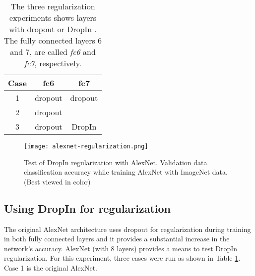 \documentclass[10pt,twocolumn,letterpaper]{article}
\newcommand{\dropin}{DropIn }
\begin{document}

\begin{table}[h]
  \vspace{-5pt}
\begin{center}
  \begin{tabular}{| c | c | c |}
    \hline
    Case & fc6 & fc7 \\ \hline \hline
   1 & dropout  & dropout \\ \hline
   2 & dropout  &  \\ \hline
   3 & dropout  & \dropin \\ \hline
  \end{tabular}
  \caption{The three regularization experiments shows layers with dropout or \dropin. The fully connected layers 6 and 7, are called \textit{fc6} and \textit{fc7}, respectively. }
  \label{tab:reg}
\end{center}
  \vspace{-15pt}
\end{table}


\begin{figure}[h]
\begin{center}
   \texttt{[image: alexnet-regularization.png]}
\end{center}
  \vspace{-10pt}
   \caption{Test of \dropin regularization with AlexNet. Validation data classification accuracy while training AlexNet with ImageNet data.  %
(Best viewed in color) 
}
\label{fig:regularization}
  \vspace{-15pt}
\end{figure}




\subsection{Using \dropin for regularization}
\label{sec:regularization}
The original AlexNet architecture uses dropout for regularization during training in both fully connected layers and it provides a substantial increase in the network's accuracy.
AlexNet (with 8 layers) provides a means to test \dropin regularization.
For this experiment, three cases were run as shown in  Table \ref{tab:reg}.
Case 1 is the original AlexNet.
\end{document}
